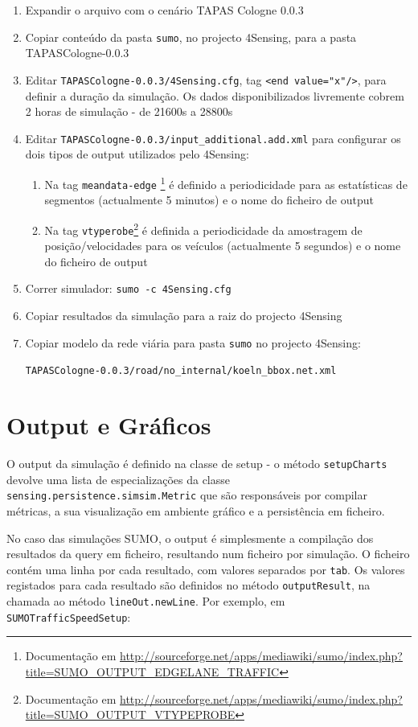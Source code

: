 \documentclass{article}
\newcommand{\tm}[1]{\texttt{#1}}
\begin{document}
\begin{enumerate}
\item Expandir o arquivo com o cenário TAPAS Cologne 0.0.3
\item Copiar conteúdo da pasta \tm{sumo}, no projecto 4Sensing, para a pasta TAPASCologne-0.0.3
\item Editar \tm{TAPASCologne-0.0.3/4Sensing.cfg}, tag \tm{<end value="x"/>}, para definir a duração da simulação. Os dados disponibilizados livremente cobrem 2 horas de simulação - de 21600s a 28800s
\item Editar \tm{TAPASCologne-0.0.3/input\_additional.add.xml} para configurar os dois tipos de output utilizados pelo 4Sensing:
\begin{enumerate}
\item Na tag \tm{meandata-edge} \footnote{Documentação em \url{http://sourceforge.net/apps/mediawiki/sumo/index.php?title=SUMO_OUTPUT_EDGELANE_TRAFFIC}} é definido a periodicidade para as estatísticas de segmentos (actualmente 5 minutos) e o nome do ficheiro de output
\item Na tag \tm{vtyperobe}\footnote{Documentação em \url{http://sourceforge.net/apps/mediawiki/sumo/index.php?title=SUMO_OUTPUT_VTYPEPROBE}} é definida a periodicidade da amostragem de posição/velocidades para os veículos (actualmente 5 segundos) e o nome do ficheiro de output
\end{enumerate}
\item Correr simulador: \tm{sumo -c 4Sensing.cfg}
\item Copiar resultados da simulação para a raiz do projecto 4Sensing
\item Copiar modelo da rede viária para pasta \tm{sumo} no projecto 4Sensing: 

\tm{TAPASCologne-0.0.3/road/no\_internal/koeln\_bbox.net.xml}
\end{enumerate}

\section{Output e Gráficos}\label{sec:output}

O output da simulação é definido na classe de setup - o método \tm{setupCharts} devolve uma lista de especializações da classe \tm{sensing.persistence.simsim.Metric} que são responsáveis por compilar métricas, a sua visualização em ambiente gráfico e a persistência em ficheiro.

No caso das simulações SUMO, o output é simplesmente a compilação dos resultados da query em ficheiro, resultando num ficheiro por simulação. O ficheiro contém uma linha por cada resultado, com valores separados por \tm{tab}. Os valores registados para cada resultado são definidos no método \tm{outputResult}, na chamada ao método \tm{lineOut.newLine}. Por exemplo, em \tm{SUMOTrafficSpeedSetup}:
\end{document}
